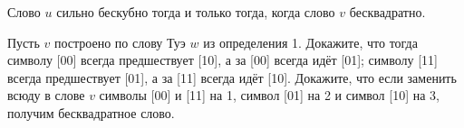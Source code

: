 \documentclass[a4paper,12pt]{article}
\begin{document}
Слово $u$ сильно бескубно тогда и только тогда, когда слово $v$ бесквадратно.

Пусть $v$ построено по слову Туэ $w$ из определения 1. Докажите, что тогда символу [00] всегда предшествует [10], а за [00] всегда идёт [01]; символу [11] всегда предшествует [01], а за [11] всегда идёт [10]. Докажите, что если заменить всюду в слове $v$ символы [00] и [11] на 1, символ [01] на 2 и символ [10] на 3, получим бесквадратное слово.





\end{document}
